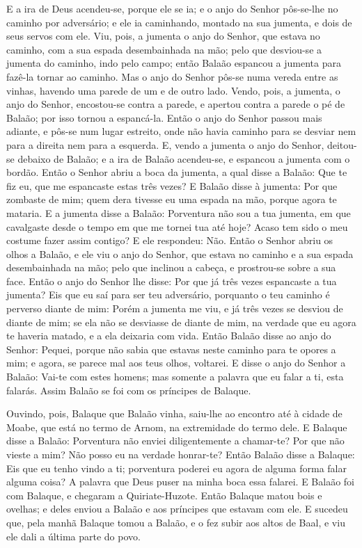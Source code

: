 E a ira de Deus acendeu-se, porque ele se ia; e o anjo do Senhor
pôs-se-lhe no caminho por adversário; e ele ia caminhando, montado
na sua jumenta, e dois de seus servos com ele. Viu, pois, a
jumenta o anjo do Senhor, que estava no caminho, com a sua espada
desembainhada na mão; pelo que desviou-se a jumenta do caminho, indo
pelo campo; então Balaão espancou a jumenta para fazê-la tornar ao
caminho. Mas o anjo do Senhor pôs-se numa vereda entre as
vinhas, havendo uma parede de um e de outro lado. Vendo,
pois, a jumenta, o anjo do Senhor, encostou-se contra a parede, e
apertou contra a parede o pé de Balaão; por isso tornou a
espancá-la. Então o anjo do Senhor passou mais adiante, e
pôs-se num lugar estreito, onde não havia caminho para se desviar
nem para a direita nem para a esquerda. E, vendo a jumenta o
anjo do Senhor, deitou-se debaixo de Balaão; e a ira de Balaão
acendeu-se, e espancou a jumenta com o bordão. Então o Senhor
abriu a boca da jumenta, a qual disse a Balaão: Que te fiz eu, que
me espancaste estas três vezes? E Balaão disse à jumenta: Por
que zombaste de mim; quem dera tivesse eu uma espada na mão, porque
agora te mataria. E a jumenta disse a Balaão: Porventura não
sou a tua jumenta, em que cavalgaste desde o tempo em que me tornei
tua até hoje? Acaso tem sido o meu costume fazer assim contigo? E
ele respondeu: Não. Então o Senhor abriu os olhos a Balaão, e
ele viu o anjo do Senhor, que estava no caminho e a sua espada
desembainhada na mão; pelo que inclinou a cabeça, e prostrou-se
sobre a sua face. Então o anjo do Senhor lhe disse: Por que
já três vezes espancaste a tua jumenta? Eis que eu saí para ser teu
adversário, porquanto o teu caminho é perverso diante de mim:
Porém a jumenta me viu, e já três vezes se desviou de diante
de mim; se ela não se desviasse de diante de mim, na verdade que eu
agora te haveria matado, e a ela deixaria com vida. Então
Balaão disse ao anjo do Senhor: Pequei, porque não sabia que estavas
neste caminho para te opores a mim; e agora, se parece mal aos teus
olhos, voltarei. E disse o anjo do Senhor a Balaão: Vai-te
com estes homens; mas somente a palavra que eu falar a ti, esta
falarás. Assim Balaão se foi com os príncipes de Balaque.

Ouvindo, pois, Balaque que Balaão vinha, saiu-lhe ao encontro até
à cidade de Moabe, que está no termo de Arnom, na extremidade do
termo dele. E Balaque disse a Balaão: Porventura não enviei
diligentemente a chamar-te? Por que não vieste a mim? Não posso eu
na verdade honrar-te? Então Balaão disse a Balaque: Eis que
eu tenho vindo a ti; porventura poderei eu agora de alguma forma
falar alguma coisa? A palavra que Deus puser na minha boca essa
falarei. E Balaão foi com Balaque, e chegaram a
Quiriate-Huzote. Então Balaque matou bois e ovelhas; e deles
enviou a Balaão e aos príncipes que estavam com ele. E
sucedeu que, pela manhã Balaque tomou a Balaão, e o fez subir aos
altos de Baal, e viu ele dali a última parte do povo.

